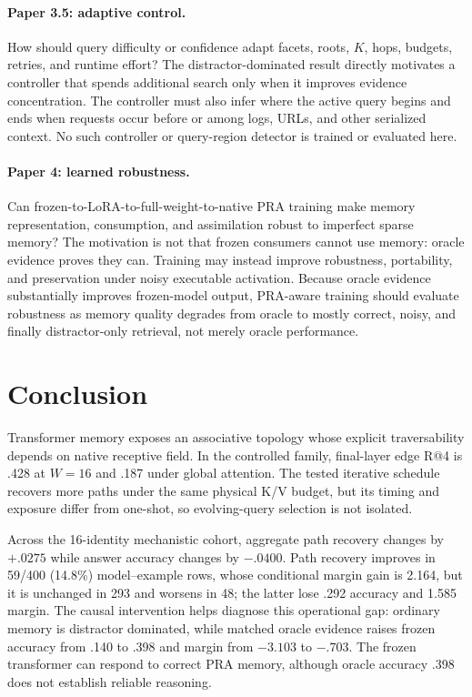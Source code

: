 \paragraph{Paper 3.5: adaptive control.}
How should query difficulty or confidence adapt facets, roots, $K$, hops, budgets, retries, and runtime
effort?  The distractor-dominated result directly motivates a controller that spends additional search
only when it improves evidence concentration.  The controller must also infer where the active query
begins and ends when requests occur before or among logs, URLs, and other serialized context.  No such
controller or query-region detector is trained or evaluated here.

\paragraph{Paper 4: learned robustness.}
Can frozen-to-LoRA-to-full-weight-to-native PRA training make memory representation, consumption, and
assimilation robust to imperfect sparse memory?  The motivation is not that frozen consumers cannot
use memory: oracle evidence proves they can.  Training may instead improve robustness, portability,
and preservation under noisy executable activation.  Because oracle evidence substantially improves
frozen-model output, PRA-aware training should evaluate robustness as memory quality degrades from
oracle to mostly correct, noisy, and finally distractor-only retrieval, not merely oracle performance.

\section{Conclusion}

Transformer memory exposes an associative topology whose explicit traversability depends on native
receptive field.  In the controlled family, final-layer edge R@4 is .428 at $W=16$ and .187 under
global attention.  The tested iterative schedule recovers more paths under the same physical K/V
budget, but its timing and exposure differ from one-shot, so evolving-query selection is not isolated.

Across the 16-identity mechanistic cohort, aggregate path recovery changes by $+.0275$ while answer
accuracy changes by $-.0400$.  Path recovery improves in 59/400 (14.8\%) model--example rows, whose
conditional margin gain is 2.164, but it is unchanged in 293 and worsens in 48; the latter lose .292
accuracy and 1.585 margin.  The causal intervention helps diagnose this operational gap:
ordinary memory is
distractor dominated, while matched oracle evidence raises frozen accuracy from .140 to .398 and
margin from $-3.103$ to $-.703$.  The frozen transformer can respond to correct PRA memory, although
oracle accuracy .398 does not establish reliable reasoning.

